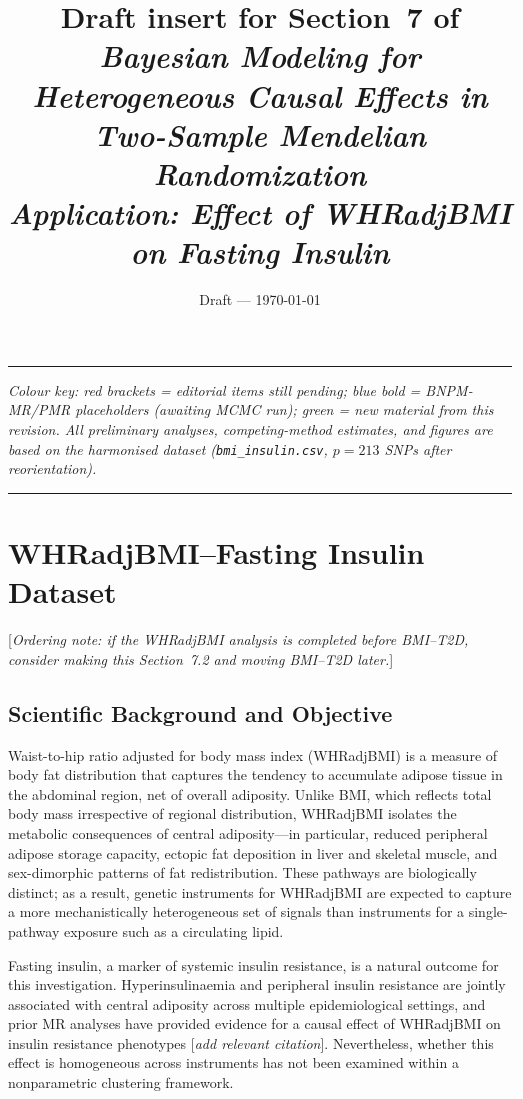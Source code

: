 \documentclass[12pt,a4paper]{article}
\title{%
  \large Draft insert for Section~7 of\\[4pt]
  \normalsize\itshape Bayesian Modeling for Heterogeneous Causal Effects
  in Two-Sample Mendelian Randomization\\[10pt]
  \large\bfseries\upshape Application: Effect of WHRadjBMI on Fasting Insulin
}
\author{}
\date{Draft --- \today}
\newcommand{\todo}[1]{\textcolor{notecol}{[\textit{#1}]}}
\begin{document}
\maketitle
\tableofcontents
\bigskip\hrule\bigskip

\noindent\textcolor{gcgray}{\itshape
  Colour key:
  \textcolor{notecol}{red brackets} = editorial items still pending;
  \textcolor{fcblue}{blue bold} = BNPM-MR/PMR placeholders (awaiting
  MCMC run);
  \textcolor{newcol}{green} = new material from this revision.
  All preliminary analyses, competing-method estimates, and figures
  are based on the harmonised dataset (\texttt{bmi\_insulin.csv},
  $p = 213$ SNPs after reorientation).}

\bigskip\hrule

\section{WHRadjBMI--Fasting Insulin Dataset}
\label{sec:whr}

\todo{Ordering note: if the WHRadjBMI analysis is completed before BMI--T2D,
consider making this Section~7.2 and moving BMI--T2D later.}

\subsection{Scientific Background and Objective}
\label{sec:whr:background}

Waist-to-hip ratio adjusted for body mass index (WHRadjBMI) is a measure
of body fat distribution that captures the tendency to accumulate adipose
tissue in the abdominal region, net of overall adiposity.  Unlike BMI, which
reflects total body mass irrespective of regional distribution, WHRadjBMI
isolates the metabolic consequences of central adiposity---in particular,
reduced peripheral adipose storage capacity, ectopic fat deposition in liver
and skeletal muscle, and sex-dimorphic patterns of fat redistribution.
These pathways are biologically distinct; as a result, genetic instruments
for WHRadjBMI are expected to capture a more mechanistically heterogeneous
set of signals than instruments for a single-pathway exposure such as a
circulating lipid.

Fasting insulin, a marker of systemic insulin resistance, is a natural
outcome for this investigation.  Hyperinsulinaemia and peripheral insulin
resistance are jointly associated with central adiposity across multiple
epidemiological settings, and prior MR analyses have provided evidence for
a causal effect of WHRadjBMI on insulin resistance phenotypes
\todo{add relevant citation}.  Nevertheless, whether this effect is
homogeneous across instruments has not been examined within a nonparametric
clustering framework.
\end{document}
